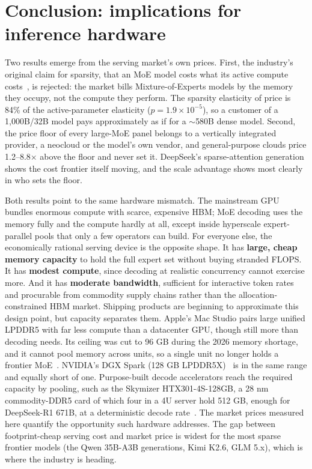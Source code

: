 \documentclass[11pt]{article}
\begin{document}
\section{Conclusion: implications for inference hardware}

Two results emerge from the serving market's own prices. First, the industry's
original claim for sparsity, that an MoE model costs what its active compute
costs~\cite{r30,r31,r32}, is rejected: the market bills Mixture-of-Experts
models by the memory they occupy, not the compute they perform. The sparsity
elasticity of price is 84\% of the active-parameter elasticity
($p = 1.9 \times 10^{-5}$), so a customer of a 1{,}000B/32B model pays
approximately as if for a $\sim$580B dense model. Second, the price floor
of every large-MoE panel belongs to a vertically integrated provider, a
neocloud or the model's own vendor, and general-purpose clouds price
1.2--8.8$\times$ above the floor and never set it. DeepSeek's sparse-attention generation shows the cost frontier itself
moving, and the scale advantage shows most clearly in who sets the floor.

Both results point to the same hardware mismatch. The mainstream GPU bundles
enormous compute with scarce, expensive HBM; MoE decoding uses the memory
fully and the compute hardly at all, except inside hyperscale expert-parallel
pools that only a few operators can build. For everyone else, the economically rational serving device is the opposite shape. It has \textbf{large, cheap memory capacity} to hold the full expert set without buying stranded FLOPS. It has \textbf{modest compute}, since decoding at realistic concurrency cannot exercise more. And it has \textbf{moderate bandwidth}, sufficient for interactive token rates and procurable from commodity supply chains rather than the allocation-constrained HBM market. Shipping products are beginning to approximate this design point, but capacity separates them. Apple's Mac Studio pairs large unified LPDDR5 with far less compute than a datacenter GPU, though still more than decoding needs. Its ceiling was cut to 96 GB during the 2026 memory shortage, and it cannot pool memory across units, so a single unit no longer holds a frontier MoE~\cite{r42}. NVIDIA's DGX Spark (128 GB LPDDR5X)~\cite{r43} is in the same range and equally short of one. Purpose-built decode accelerators reach the required capacity by pooling, such as the Skymizer HTX301-4S-128GB, a 28 nm commodity-DDR5 card of which four in a 4U server hold 512 GB, enough for DeepSeek-R1 671B, at a deterministic decode rate~\cite{r44}. The
market prices measured here quantify the opportunity such hardware
addresses. The gap between footprint-cheap serving cost and market price is
widest for the most sparse frontier models (the Qwen 35B-A3B generations,
Kimi K2.6, GLM 5.x), which is where the industry is heading.
\end{document}
